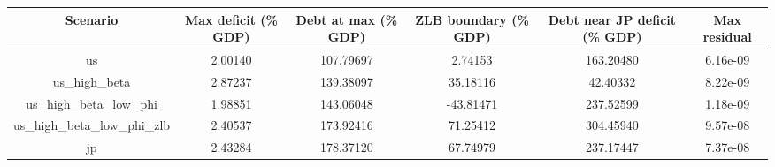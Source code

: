 \begin{table}[!ht]
\setlength\tabcolsep{0.425em}
\setlength\aboverulesep{0pt}
\setlength\belowrulesep{0.2em}
\centering
\begin{threeparttable}
\begin{tabular}{cccccc}
\toprule[0.1em]
Scenario & Max deficit (\% GDP) & Debt at max (\% GDP) & ZLB boundary (\% GDP) & Debt near JP deficit (\% GDP) & Max residual \\[0.2em]
\midrule[0.075em]
us & 2.00140 & 107.79697 & 2.74153 & 163.20480 & 6.16e-09 \\[0.2em]
us\_high\_beta & 2.87237 & 139.38097 & 35.18116 & 42.40332 & 8.22e-09 \\[0.2em]
us\_high\_beta\_low\_phi & 1.98851 & 143.06048 & -43.81471 & 237.52599 & 1.18e-09 \\[0.2em]
us\_high\_beta\_low\_phi\_zlb & 2.40537 & 173.92416 & 71.25412 & 304.45940 & 9.57e-08 \\[0.2em]
jp & 2.43284 & 178.37120 & 67.74979 & 237.17447 & 7.37e-08 \\[0.2em]
\bottomrule[0.1em]
\end{tabular}
\end{threeparttable}
\end{table}

